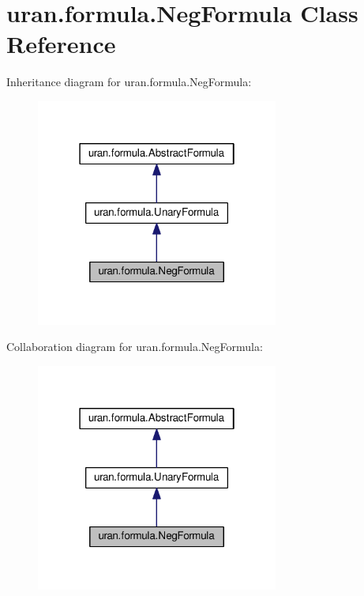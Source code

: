 \hypertarget{classuran_1_1formula_1_1_neg_formula}{}\section{uran.\+formula.\+Neg\+Formula Class Reference}
\label{classuran_1_1formula_1_1_neg_formula}


Inheritance diagram for uran.\+formula.\+Neg\+Formula\+:
\nopagebreak
\begin{figure}[H]
\begin{center}
\leavevmode
\includegraphics[width=226pt]{classuran_1_1formula_1_1_neg_formula__inherit__graph}
\end{center}
\end{figure}


Collaboration diagram for uran.\+formula.\+Neg\+Formula\+:
\nopagebreak
\begin{figure}[H]
\begin{center}
\leavevmode
\includegraphics[width=226pt]{classuran_1_1formula_1_1_neg_formula__coll__graph}
\end{center}
\end{figure}
